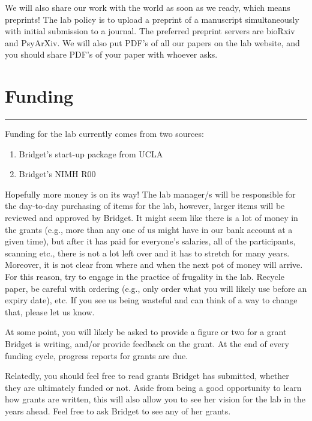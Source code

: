 \documentclass[]{book}
\providecommand{\tightlist}{%
  \setlength{\itemsep}{0pt}\setlength{\parskip}{0pt}}
\begin{document}
We will also share our work with the world as soon as we ready, which means preprints! The lab policy is to upload a preprint of a manuscript simultaneously with initial submission to a journal. The preferred preprint servers are bioRxiv and PsyArXiv. We will also put PDF's of all our papers on the lab website, and you should share PDF's of your paper with whoever asks.

\hypertarget{funding}{%
\chapter{Funding}\label{funding}}

\begin{center}\rule{0.5\linewidth}{\linethickness}\end{center}

Funding for the lab currently comes from two sources:

\begin{enumerate}
\def\labelenumi{\arabic{enumi}.}
\tightlist
\item
  Bridget's start-up package from UCLA
\item
  Bridget's NIMH R00
\end{enumerate}

Hopefully more money is on its way! The lab manager/s will be responsible for the day-to-day purchasing of items for the lab, however, larger items will be reviewed and approved by Bridget. It might seem like there is a lot of money in the grants (e.g., more than any one of us might have in our bank account at a given time), but after it has paid for everyone's salaries, all of the participants, scanning etc., there is not a lot left over and it has to stretch for many years. Moreover, it is not clear from where and when the next pot of money will arrive. For this reason, try to engage in the practice of frugality in the lab. Recycle paper, be careful with ordering (e.g., only order what you will likely use before an expiry date), etc. If you see us being wasteful and can think of a way to change that, please let us know.

At some point, you will likely be asked to provide a figure or two for a grant Bridget is writing, and/or provide feedback on the grant. At the end of every funding cycle, progress reports for grants are due.

Relatedly, you should feel free to read grants Bridget has submitted, whether they are ultimately funded or not. Aside from being a good opportunity to learn how grants are written, this will also allow you to see her vision for the lab in the years ahead. Feel free to ask Bridget to see any of her grants.
\end{document}
